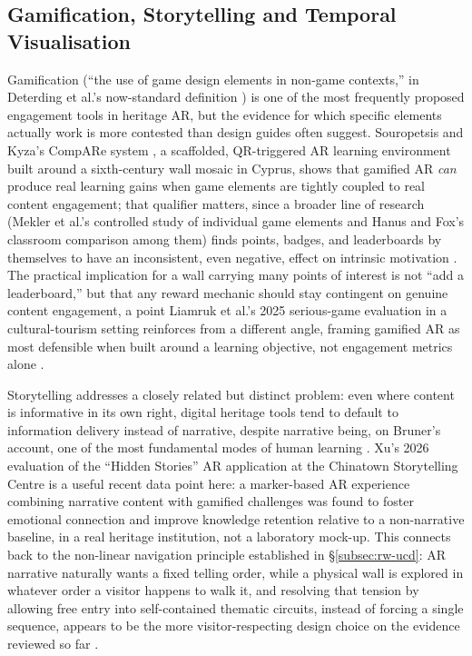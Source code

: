 \subsection{Gamification, Storytelling and Temporal Visualisation}
\label{subsec:rw-gamification-storytelling}

Gamification (``the use of game design elements in non-game contexts,'' in Deterding et al.'s now-standard definition \cite{deterding2011}) is one of
the most frequently proposed engagement tools in heritage AR, but the evidence
for which specific elements actually work is more contested than design
guides often suggest. Souropetsis and Kyza's CompARe system \cite{souropetsis2025},
a scaffolded, QR-triggered AR learning environment built around a sixth-century
wall mosaic in Cyprus, shows that gamified AR \emph{can} produce real
learning gains when game elements are tightly coupled to real content
engagement; that qualifier matters, since a
broader line of research (Mekler et al.'s controlled study of individual game elements and Hanus and Fox's classroom comparison among them) finds
points, badges, and leaderboards by themselves to have an inconsistent, even
negative, effect on intrinsic motivation \cite{mekler2017,hanusfox2015}. The
practical implication for a wall carrying many points of interest is not
``add a leaderboard,'' but that any reward mechanic should stay contingent on
genuine content engagement, a point Liamruk et al.'s 2025 serious-game
evaluation in a cultural-tourism setting reinforces from a different angle,
framing gamified AR as most defensible when built around a learning
objective, not engagement metrics alone \cite{liamruk2025}.

Storytelling addresses a closely related but distinct problem: even where
content is informative in its own right, digital heritage tools tend to default to
information delivery instead of narrative, despite narrative being, on
Bruner's account, one of the most fundamental modes of human learning
\cite{gkatsou2018}. Xu's 2026 evaluation of the ``Hidden Stories'' AR
application at the Chinatown Storytelling Centre \cite{xu2026chinatown} is a
useful recent data point here: a marker-based AR experience combining
narrative content with gamified challenges was found to foster emotional
connection and improve knowledge retention relative to a non-narrative
baseline, in a real heritage institution, not a laboratory mock-up.
This connects back to the non-linear navigation principle established in
\S\ref{subsec:rw-ucd}: AR narrative naturally wants a fixed telling order,
while a physical wall is explored in whatever order a visitor happens to
walk it, and resolving that tension by allowing free entry into self-contained
thematic circuits, instead of forcing a single sequence, appears to be the
more visitor-respecting design choice on the evidence reviewed so far
\cite{gkatsou2018}.

